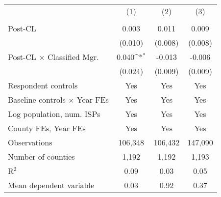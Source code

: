 {
\def\sym#1{\ifmmode^{#1}\else\(^{#1}\)\fi}
\begin{tabular}{l*{3}{c}}
\toprule
                    &&&\\
                    &&&\\
\midrule
Post-CL             &       0.003         &       0.011         &       0.009         \\
                    &     (0.010)         &     (0.008)         &     (0.008)         \\
\addlinespace
Post-CL $\times$ Classified Mgr.&       0.040\sym{*}  &      -0.013         &      -0.006         \\
                    &     (0.024)         &     (0.009)         &     (0.009)         \\
\addlinespace
Respondent controls &         Yes         &         Yes         &         Yes         \\
\addlinespace
Baseline controls $\times$ Year FEs &         Yes         &         Yes         &         Yes         \\
\addlinespace
Log population, num. ISPs  &         Yes         &         Yes         &         Yes         \\
\addlinespace
County FEs, Year FEs &         Yes         &         Yes         &         Yes         \\
\midrule
Observations        &     106,348         &     106,432         &     147,090         \\
Number of counties  &       1,192         &       1,192         &       1,193         \\
R$^2$               &        0.09         &        0.03         &        0.05         \\
Mean dependent variable&        0.03         &        0.92         &        0.37         \\
\bottomrule
\end{tabular}
}
